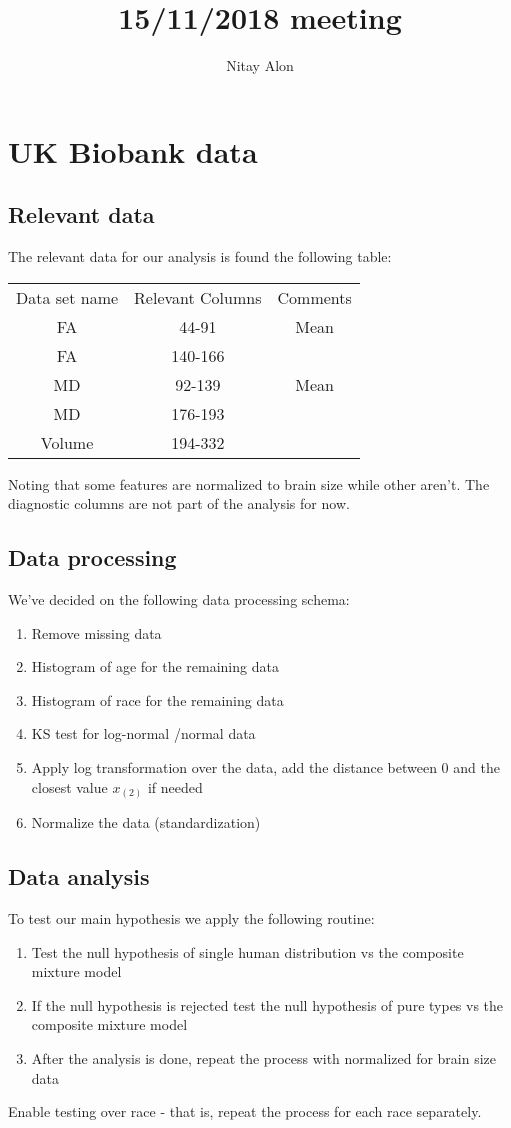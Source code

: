 \documentclass[12pt]{article}
\title{15/11/2018 meeting}
\author{Nitay Alon}
\begin{document}
\maketitle

\section{UK Biobank data}
\subsection*{Relevant data}
The relevant data for our analysis is found the following table:
	\begin{center}
		\begin{tabular}{|c|c|c|}
			\hline
			Data set name & Relevant Columns & Comments\\
			FA & 44-91 & Mean \\
			FA & 140-166 & \\
			\hline
			MD & 92-139 & Mean \\
			MD & 176-193 & \\
			\hline
			Volume & 194-332 & \\
			\hline
		\end{tabular}
	\end{center}
Noting that some features are normalized to brain size while other aren't.
The diagnostic columns are not part of the analysis for now.
\subsection*{Data processing}
We've decided on the following data processing schema:
	\begin{enumerate}
		\item Remove missing data
		\item Histogram of age for the remaining data
		\item Histogram of race for the remaining data
		\item KS test for log-normal /normal data
		\item Apply log transformation over the data, add the distance between 0 and the closest value $x_{(2)}$ if needed
		\item Normalize the data (standardization)
	\end{enumerate}
\subsection*{Data analysis}
To test our main hypothesis we apply the following routine:
	\begin{enumerate}
		\item Test the null hypothesis of single human distribution vs the composite mixture model
		\item If the null hypothesis is rejected test the null hypothesis of pure types vs the composite mixture model
		\item After the analysis is done, repeat the process with normalized for brain size data		
	\end{enumerate}
Enable testing over race - that is, repeat the process for each race separately.
\end{document}
